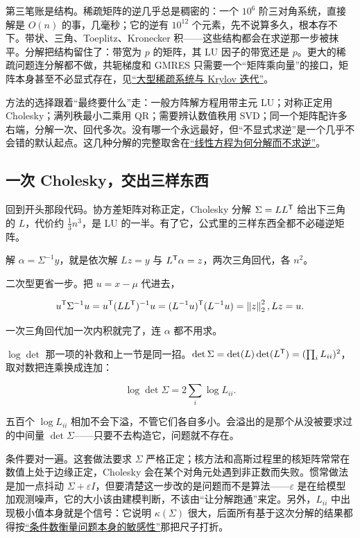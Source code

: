第三笔账是结构。稀疏矩阵的逆几乎总是稠密的：一个 \(10^6\) 阶三对角系统，直接解是 \(O(n)\) 的事，几毫秒；它的逆有 \(10^{12}\) 个元素，先不说算多久，根本存不下。带状、三角、Toeplitz、Kronecker 积——这些结构都会在求逆那一步被抹平。分解把结构留住了：带宽为 \(p\) 的矩阵，其 LU 因子的带宽还是 \(p\)。更大的稀疏问题连分解都不做，共轭梯度和 GMRES 只需要一个``矩阵乘向量''的接口，矩阵本身甚至不必显式存在，见\hyperref[sec:08-Numerical-Analysis/05-Numerical-Linear-Algebra/04]{``大型稀疏系统与 Krylov 迭代''}。

方法的选择跟着``最终要什么''走：一般方阵解方程用带主元 LU；对称正定用 Cholesky；满列秩最小二乘用 QR；需要辨认数值秩用 SVD；同一个矩阵配许多右端，分解一次、回代多次。没有哪一个永远最好，但``不显式求逆''是一个几乎不会错的默认起点。这几种分解的完整取舍在\hyperref[sec:08-Numerical-Analysis/05-Numerical-Linear-Algebra/01]{``线性方程为何分解而不求逆''}。

\subsection{一次 Cholesky，交出三样东西}

回到开头那段代码。协方差矩阵对称正定，Cholesky 分解 \(\Sigma=LL^{\mathsf{T}}\) 给出下三角的 \(L\)，代价约 \(\tfrac13n^3\)，是 LU 的一半。有了它，公式里的三样东西全都不必碰逆矩阵。

解 \(\alpha=\Sigma^{-1}y\)，就是依次解 \(L z=y\) 与 \(L^{\mathsf{T}}\alpha=z\)，两次三角回代，各 \(n^2\)。

二次型更省一步。把 \(u=x-\mu\) 代进去，

\[
u^{\mathsf{T}}\Sigma^{-1}u=u^{\mathsf{T}}(LL^{\mathsf{T}})^{-1}u=(L^{-1}u)^{\mathsf{T}}(L^{-1}u)=\left\lVert z\right\rVert_2^2,
\space Lz=u.
\]

一次三角回代加一次内积就完了，连 \(\alpha\) 都不用求。

\(\log\det\) 那一项的补救和上一节是同一招。\(\det\Sigma=\det(L)\det(L^{\mathsf{T}})=(\prod_i L_{ii})^2\)，取对数把连乘换成连加：

\[
\log\det\Sigma=2\sum_i\log L_{ii}.
\]

五百个 \(\log L_{ii}\) 相加不会下溢，不管它们各自多小。会溢出的是那个从没被要求过的中间量 \(\det\Sigma\)——只要不去构造它，问题就不存在。

条件要对一遍。这套做法要求 \(\Sigma\) 严格正定；核方法和高斯过程里的核矩阵常常在数值上处于边缘正定，Cholesky 会在某个对角元处遇到非正数而失败。惯常做法是加一点抖动 \(\Sigma+\varepsilon I\)，但要清楚这一步改的是问题而不是算法——\(\varepsilon\) 是在给模型加观测噪声，它的大小该由建模判断，不该由``让分解跑通''来定。另外，\(L_{ii}\) 中出现极小值本身就是个信号：它说明 \(\kappa(\Sigma)\) 很大，后面所有基于这次分解的结果都得按\hyperref[sec:08-Numerical-Analysis/01-Floating-Point-and-Error/03]{``条件数衡量问题本身的敏感性''}那把尺子打折。


